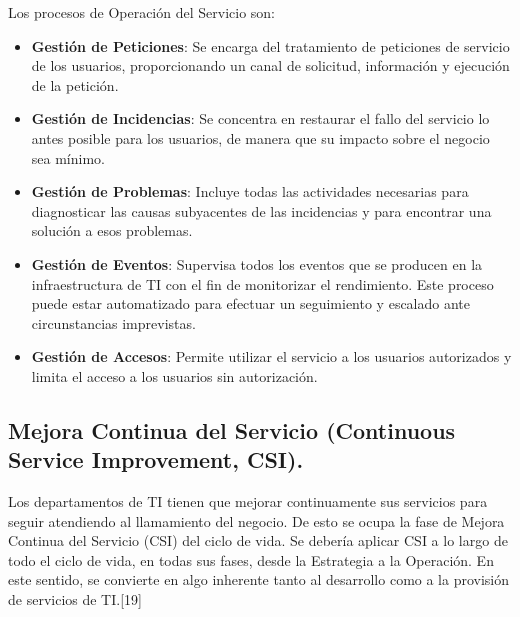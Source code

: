 Los procesos de Operación del Servicio son: 

\begin{itemize}
	\item \textbf{Gestión de Peticiones}: Se encarga del tratamiento de peticiones de servicio de los usuarios, proporcionando un canal de solicitud, información y ejecución de la petición. 
\item \textbf{Gestión de Incidencias}: Se concentra en restaurar el fallo del servicio lo antes posible para los usuarios, de manera que su impacto sobre el negocio sea mínimo. 
\item\textbf{ Gestión de Problemas}: Incluye todas las actividades necesarias para diagnosticar las causas subyacentes de las incidencias y para encontrar una solución a esos problemas. 
\item \textbf{Gestión de Eventos}: Supervisa todos los eventos que se producen en la infraestructura de TI con el fin de monitorizar el rendimiento. Este proceso puede estar automatizado para efectuar un seguimiento y escalado ante circunstancias imprevistas.
\item \textbf{Gestión de Accesos}: Permite utilizar el servicio a los usuarios autorizados y limita el acceso a los usuarios sin autorización.
	
\end{itemize}


\subsection{Mejora Continua del Servicio (Continuous Service Improvement, CSI).}

Los departamentos de TI tienen que mejorar continuamente sus servicios para seguir atendiendo al llamamiento del negocio. De esto se ocupa la fase de Mejora Continua del Servicio (CSI) del ciclo de vida.
Se debería aplicar CSI a lo largo de todo el ciclo de vida, en todas sus fases, desde la Estrategia a la Operación. En este sentido, se convierte en algo inherente tanto al desarrollo como a la provisión de servicios de TI.[19]
